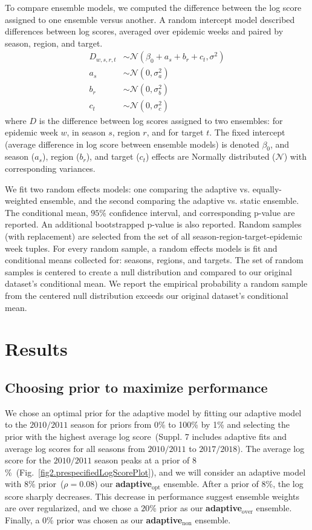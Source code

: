 \documentclass[sagev,times,Review,10pt]{sagej}
\def\l{\left}
\def\r{\right}
\def\adaptNon{\textbf{adaptive$_{\text{non}}$ }}
\def\adaptOpt{\textbf{adaptive$_{\text{opt}}$ }}
\def\adaptOver{\textbf{adaptive$_{\text{over}}$ }}
\begin{document}
To compare ensemble models, we computed the difference between the log score assigned to one ensemble versus another.
A random intercept model described differences between log scores, averaged over epidemic weeks and paired by season, region, and target.
\begin{align}
    D_{w,s,r,t} &\sim \mathcal{N}\l( \beta_{0} + a_{s} + b_{r} + c_{t}, \sigma^{2} \r)\\
    a_{s} &\sim \mathcal{N}\l(0,\sigma^{2}_{a}\r) \nonumber \\
    b_{r} &\sim \mathcal{N}\l(0,\sigma^{2}_{b}\r) \nonumber \\
    c_{t} &\sim \mathcal{N}\l(0,\sigma^{2}_{c}\r) \nonumber
\end{align}
where $D$ is the difference between log scores assigned to two ensembles: for epidemic week $w$, in season $s$, region $r$, and for target $t$.
The fixed intercept (average difference in log score between ensemble models) is denoted $\beta_{0}$, and season ($a_{s}$), region ($b_{r}$), and target ($c_{t}$) effects are Normally distributed ($\mathcal{N}$) with corresponding variances.

We fit two random effects models: one comparing the adaptive vs. equally-weighted ensemble, and the second comparing the adaptive vs. static ensemble.
The conditional mean, $95$\% confidence interval, and corresponding p-value are reported.
An additional bootstrapped p-value is also reported.
Random samples (with replacement) are selected from the set of all season-region-target-epidemic week tuples.
For every random sample, a random effects models is fit and conditional means collected for: seasons, regions, and targets. 
The set of random samples is centered to create a null distribution and compared to our original dataset's conditional mean.
We report the empirical probability a random sample from the centered null distribution exceeds our original dataset's conditional mean.

\section{Results}

\subsection{Choosing prior to maximize performance}

We chose an optimal prior for the adaptive model by fitting our adaptive model to the $2010/2011$ season for priors from 0\% to 100\% by 1\% and selecting the prior with the highest average log score~(Suppl. 7 %
includes adaptive fits and average log scores for all seasons from $2010/2011$ to $2017/2018$).
The average log score for the $2010/2011$ season peaks at a prior of $8$\%~(Fig.~\ref{fig2.prespecifiedLogScorePlot}), and we will consider an adaptive model with $8$\% prior~($\rho=0.08$) our \adaptOpt ensemble.
After a prior of $8$\%, the log score sharply decreases.
This decrease in performance suggest ensemble weights are over regularized, and we chose a $20$\% prior as our \adaptOver ensemble.
Finally, a $0$\% prior was chosen as our \adaptNon ensemble.
\end{document}
